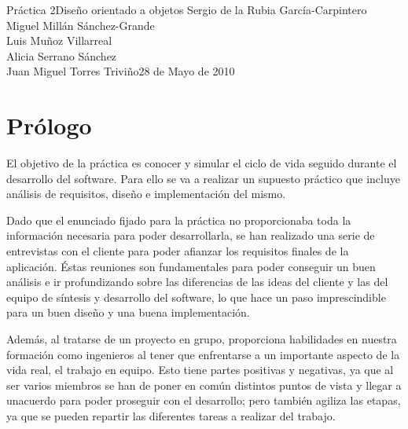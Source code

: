 \documentclass[11pt,a4paper,spanish,twoside]{book}
\begin{document}


{Práctica 2}{Diseño orientado a objetos}
{Sergio de la Rubia García-Carpintero\\Miguel Millán Sánchez-Grande\\
  Luis Muñoz Villarreal\\Alicia Serrano Sánchez\\
  Juan Miguel Torres Triviño}{28 de Mayo de 2010}


\tableofcontents

\chapter*{Prólogo}
El objetivo de la práctica es conocer y simular el ciclo de vida seguido
durante el desarrollo del software. Para ello se va a realizar un supuesto
práctico que incluye análisis de requisitos, diseño e implementación del
mismo. 

Dado que el enunciado fijado para la práctica no proporcionaba toda la
información necesaria para poder desarrollarla, se han realizado
una serie de entrevistas con el cliente para poder afianzar los requisitos
finales de la aplicación. Éstas reuniones son fundamentales para poder
conseguir un buen análisis e ir profundizando sobre las diferencias de las
ideas del cliente y las del equipo de síntesis y desarrollo del software, lo
que hace un paso imprescindible para un buen diseño y una buena implementación.

Además, al tratarse de un proyecto en grupo, proporciona habilidades en
nuestra formación como ingenieros al tener que enfrentarse a un importante
aspecto de la vida real, el trabajo en equipo. Esto tiene partes positivas y
negativas, ya que al ser varios miembros se han de poner en común distintos
puntos de vista y llegar a unacuerdo para poder proseguir con el desarrollo;
pero también agiliza las etapas, ya que se pueden repartir las diferentes
tareas a realizar del trabajo. 
\end{document}

